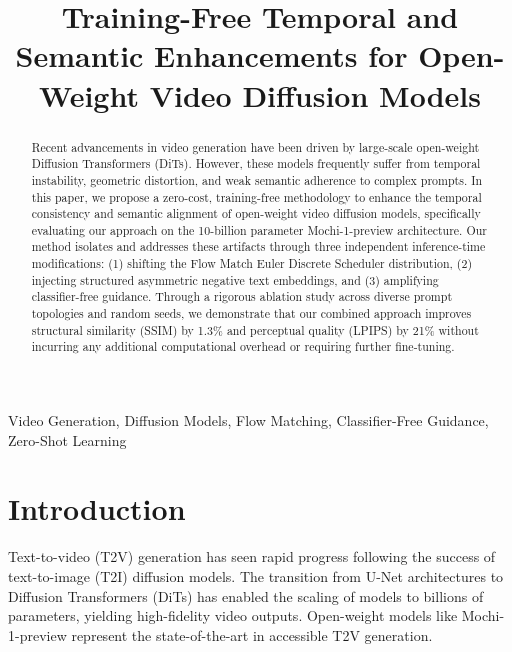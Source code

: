 \documentclass[10pt, conference]{IEEEtran}
\begin{document}
\title{Training-Free Temporal and Semantic Enhancements for Open-Weight Video Diffusion Models}

\author{
}

\maketitle

\begin{abstract}
Recent advancements in video generation have been driven by large-scale open-weight Diffusion Transformers (DiTs). However, these models frequently suffer from temporal instability, geometric distortion, and weak semantic adherence to complex prompts. In this paper, we propose a zero-cost, training-free methodology to enhance the temporal consistency and semantic alignment of open-weight video diffusion models, specifically evaluating our approach on the 10-billion parameter Mochi-1-preview architecture. Our method isolates and addresses these artifacts through three independent inference-time modifications: (1) shifting the Flow Match Euler Discrete Scheduler distribution, (2) injecting structured asymmetric negative text embeddings, and (3) amplifying classifier-free guidance. Through a rigorous ablation study across diverse prompt topologies and random seeds, we demonstrate that our combined approach improves structural similarity (SSIM) by 1.3\% and perceptual quality (LPIPS) by 21\% without incurring any additional computational overhead or requiring further fine-tuning.
\end{abstract}

\begin{IEEEkeywords}
Video Generation, Diffusion Models, Flow Matching, Classifier-Free Guidance, Zero-Shot Learning
\end{IEEEkeywords}

\section{Introduction}
Text-to-video (T2V) generation has seen rapid progress following the success of text-to-image (T2I) diffusion models. The transition from U-Net architectures to Diffusion Transformers (DiTs) has enabled the scaling of models to billions of parameters, yielding high-fidelity video outputs. Open-weight models like Mochi-1-preview represent the state-of-the-art in accessible T2V generation.
\end{document}
